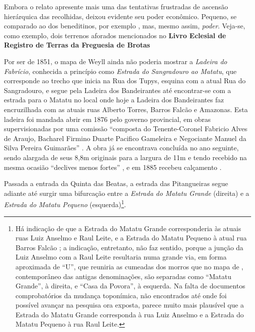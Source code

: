 Embora o relato apresente mais uma das tentativas frustradas de ascensão hierárquica das recolhidas, deixou evidente seu poder econômico. Pequeno, se comparado ao dos beneditinos, por exemplo \cite{bento_tombo_1945}, mas, mesmo assim, \textit{poder}. Veja-se, como exemplo, dois terrenos aforados mencionados no \textbf{Livro Eclesial de Registro de Terras da Freguesia de Brotas}

\begin{citacao}

\end{citacao}

Por ser de 1851, o mapa de Weyll ainda não poderia mostrar a \textit{Ladeira do Fabrício}, conhecida a princípio como \textit{Estrada do Sangradouro ao Matatu}, que corresponde ao trecho que inicia na Rua dos Tupys, esquina com a atual Rua do Sangradouro, e segue pela Ladeira dos Bandeirantes até encontrar-se com a estrada para o Matatu no local onde hoje a Ladeira dos Bandeirantes faz encruzilhada com as atuais ruas Alberto Torres, Barros Falcão e Amazonas. Esta ladeira foi mandada abrir em 1876 pelo governo provincial, em obras supervisionadas por uma comissão ``composta do Tenente-Coronel Fabricio Alves de Araujo, Bacharel Firmino Duarte Pacifico Gameleira e Negociante Manuel da Silva Pereira Guimarães'' \cite[p.~23]{bahia_1878}. A obra já se encontrava concluída no ano seguinte, sendo alargada de seus 8,8m originais para a largura de 11m e tendo recebido na mesma ocasião ``declives menos fortes'' \cite[p.~228]{bahia_1879}, e em 1885 recebeu calçamento \cite[p.~11]{bahia_1885}.

Passada a entrada da Quinta das Beatas, a estrada das Pitangueiras segue adiante até surgir uma bifurcação entre a \textit{Estrada do Matatu Grande} (direita) e a \textit{Estrada do Matatu Pequeno} (esquerda)\footnote{Há indicação de que a Estrada do Matatu Grande corresponderia às atuais ruas Luiz Anselmo e Raul Leite, e a Estrada do Matatu Pequeno à atual rua Barros Falcão \cite[p.~124]{valladares_beaba_2012}; a indicação, entretanto, não faz sentido, porque a junção da Luiz Anselmo com a Raul Leite resultaria numa grande via, em forma aproximada de ``U'', que reuniria as cumeadas dos morros que no mapa de , contemporâneo das antigas denominações, são separadas como ``Matatu Grande'', à direita, e ``Casa da Povora'', à esquerda. Na falta de documentos comprobatórios da mudança toponímica, não encontrados até onde foi possível avançar na pesquisa ora exposta, parece muito mais plausível que a Estrada do Matatu Grande corresponda à rua Luiz Anselmo e a Estrada do Matatu Pequeno à rua Raul Leite.}.

